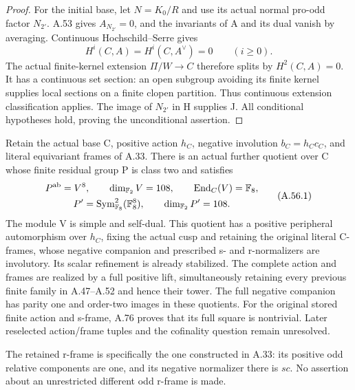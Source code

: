 \begin{proof}
For the initial base, let \(N=K_0/R\) and use its actual normal
pro-odd factor \(N_{2'}\). A.53 gives \(A_{N_{2'}}=0\), and
the invariants of A and its dual vanish by averaging. Continuous
Hochschild--Serre gives
\[
 H^i(C,A)=H^i(C,A^\vee)=0\qquad(i\geq0). \tag{A.55.7}
\]
The actual finite-kernel extension \(\Pi/W\to C\) therefore
splits by \(H^2(C,A)=0\). It has a continuous set section: an
open subgroup avoiding its finite kernel supplies local sections
on a finite clopen partition. Thus continuous extension classification
applies. The image of \(N_{2'}\) in H supplies J. All conditional
hypotheses hold, proving the unconditional assertion.
\end{proof}

Retain the actual base C, positive action \(h_C\), negative
involution \(b_C=h_Cc_C\), and literal equivariant frames of A.33.
There is an actual further quotient over C whose finite residual
group P is class two and satisfies
\[
 \begin{gathered}
 P^{\rm ab}=V^8,\qquad \dim_{\mathbb F_2}V=108,
 \qquad\operatorname{End}_C(V)=\mathbb F_8,\\
 P'=\operatorname{Sym}^2_{\mathbb F_8}(\mathbb F_8^8),
 \qquad\dim_{\mathbb F_2}P'=108.
 \end{gathered}\tag{A.56.1}
\]
The module V is simple and self-dual. This quotient has a positive
peripheral automorphism over \(h_C\), fixing the actual cusp and
retaining the original literal C-frames, whose negative companion
and prescribed s- and r-normalizers are involutory. Its scalar
refinement is already stabilized. The complete action and frames
are realized by a full positive lift, simultaneously retaining
every previous finite family in A.47--A.52 and hence their tower.
The full negative companion has parity one and order-two images
in these quotients. For the original stored finite action and s-frame,
A.76 proves that its full square is nontrivial. Later reselected
action/frame tuples and the cofinality question remain unresolved.

The retained r-frame is specifically the one constructed in A.33:
its positive odd relative components are one, and its negative
normalizer there is \(sc\). No assertion about an unrestricted
different odd r-frame is made.

